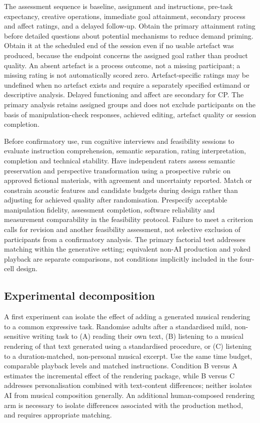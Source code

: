 \documentclass[11pt,a4paper]{article}
\begin{document}
The assessment sequence is baseline, assignment and instructions, pre-task expectancy, creative operations, immediate goal attainment, secondary process and affect ratings, and a delayed follow-up. Obtain the primary attainment rating before detailed questions about potential mechanisms to reduce demand priming. Obtain it at the scheduled end of the session even if no usable artefact was produced, because the endpoint concerns the assigned goal rather than product quality. An absent artefact is a process outcome, not a missing participant; a missing rating is not automatically scored zero. Artefact-specific ratings may be undefined when no artefact exists and require a separately specified estimand or descriptive analysis. Delayed functioning and affect are secondary for CP. The primary analysis retains assigned groups and does not exclude participants on the basis of manipulation-check responses, achieved editing, artefact quality or session completion.

Before confirmatory use, run cognitive interviews and feasibility sessions to evaluate instruction comprehension, semantic separation, rating interpretation, completion and technical stability. Have independent raters assess semantic preservation and perspective transformation using a prospective rubric on approved fictional materials, with agreement and uncertainty reported. Match or constrain acoustic features and candidate budgets during design rather than adjusting for achieved quality after randomisation. Prespecify acceptable manipulation fidelity, assessment completion, software reliability and measurement comparability in the feasibility protocol. Failure to meet a criterion calls for revision and another feasibility assessment, not selective exclusion of participants from a confirmatory analysis. The primary factorial test addresses matching within the generative setting; equivalent non-AI production and yoked playback are separate comparisons, not conditions implicitly included in the four-cell design.

\subsection{Experimental decomposition}
A first experiment can isolate the effect of adding a generated musical rendering to a common expressive task. Randomise adults after a standardised mild, non-sensitive writing task to (A) reading their own text, (B) listening to a musical rendering of that text generated using a standardised procedure, or (C) listening to a duration-matched, non-personal musical excerpt. Use the same time budget, comparable playback levels and matched instructions. Condition B versus A estimates the incremental effect of the rendering package, while B versus C addresses personalisation combined with text-content differences; neither isolates AI from musical composition generally. An additional human-composed rendering arm is necessary to isolate differences associated with the production method, and requires appropriate matching.
\end{document}
